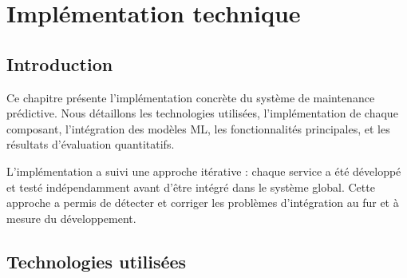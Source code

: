 ﻿%
\chapter{Implémentation technique}

\section{Introduction}

Ce chapitre présente l'implémentation concrète du système de maintenance prédictive.
Nous détaillons les technologies utilisées, l'implémentation de chaque composant,
l'intégration des modèles ML, les fonctionnalités principales, et les résultats
d'évaluation quantitatifs.

L'implémentation a suivi une approche itérative : chaque service a été développé et
testé indépendamment avant d'être intégré dans le système global. Cette approche a
permis de détecter et corriger les problèmes d'intégration au fur et à mesure du
développement.

\section{Technologies utilisées}

